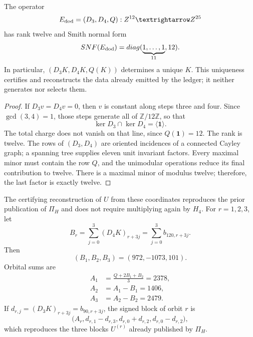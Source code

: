 \begin{theorem}
\label{p12-83-c10-s1:thm:completitud-extractor-transversal-k}
The operator
\[
 \mathcal E_{\rm dod}=(D_3,D_4,Q):
 \mathbb Z^{12}\longrightarrow\mathbb Z^{25}
\]
has rank twelve and Smith normal form
\begin{equation}
 \operatorname{SNF}(\mathcal E_{\rm dod})
 =\operatorname{diag}(\underbrace{1,\ldots,1}_{11},12).
 \label{p12-83-c10-s1:eq:snf-extractor-transversal-k}
\end{equation}
In particular, \((D_3K,D_4K,Q(K))\) determines a unique \(K\). This
uniqueness certifies and reconstructs the data already emitted by the ledger; it neither
generates nor selects them.
\end{theorem}

\begin{proof}
If \(D_3v=D_4v=0\), then \(v\) is constant along steps
three and four. Since \(\gcd(3,4)=1\), those steps generate all of
\(\mathbb Z/12\mathbb Z\), so that
\[
 \ker D_3\cap\ker D_4=\langle\mathbf1\rangle.
\]
The total charge does not vanish on that line, since \(Q(\mathbf1)=12\). The rank
is twelve. The rows of \((D_3,D_4)\) are oriented incidences of a connected
Cayley graph; a spanning tree supplies eleven unit
invariant factors. Every maximal minor must contain the row \(Q\), and the
unimodular operations reduce its final contribution to twelve. There is a maximal minor of
modulus twelve; therefore, the last factor is exactly twelve.
\end{proof}

The certifying reconstruction of \(U\) from these coordinates reproduces the
prior publication of \(\Pi_H\) and does not require multiplying again by
\(H_4\). For \(r=1,2,3\), let
\begin{equation}
 B_r=\sum_{j=0}^{3}(D_4K)_{r+3j}
 =\sum_{j=0}^{3}b_{120,r+3j}.
 \label{p12-83-c10-s1:eq:br-diferencias-k}
\end{equation}
Then
\[
 (B_1,B_2,B_3)=(972,-1073,101).
\]
Orbital sums are
\begin{align}
 A_1&=\frac{Q+2B_1+B_2}{3}=2378,
 \label{p12-83-c10-s1:eq:a1-reconstruccion-u}\\
 A_2&=A_1-B_1=1406,
 \label{p12-83-c10-s1:eq:a2-reconstruccion-u}\\
 A_3&=A_2-B_2=2479.
 \label{p12-83-c10-s1:eq:a3-reconstruccion-u}
\end{align}
If \(d_{r,j}=(D_3K)_{r+3j}=b_{90,r+3j}\), the signed block of orbit
\(r\) is
\begin{equation}
 \bigl(A_r,
 d_{r,1}-d_{r,3},
 d_{r,0}+d_{r,2},
 d_{r,0}-d_{r,2}\bigr),
 \label{p12-83-c10-s1:eq:bloque-firmado-desde-diferencias}
\end{equation}
which reproduces the three blocks \(U^{(r)}\) already published by \(\Pi_H\).

